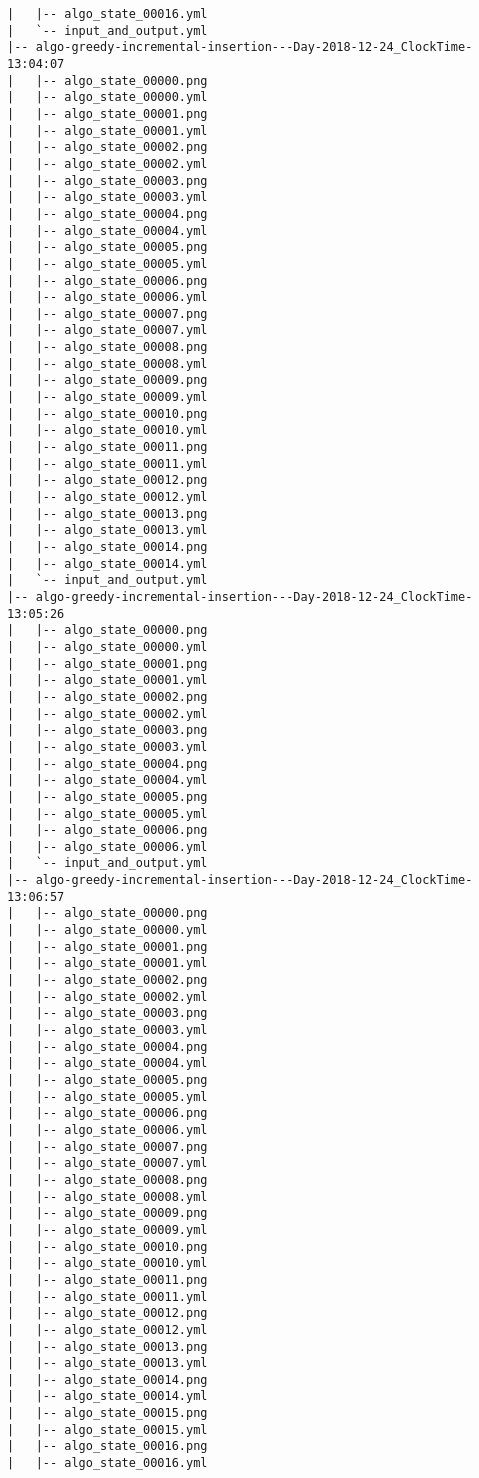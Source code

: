 \begin{verbatim}
|   |-- algo_state_00016.yml
|   `-- input_and_output.yml
|-- algo-greedy-incremental-insertion---Day-2018-12-24_ClockTime-13:04:07
|   |-- algo_state_00000.png
|   |-- algo_state_00000.yml
|   |-- algo_state_00001.png
|   |-- algo_state_00001.yml
|   |-- algo_state_00002.png
|   |-- algo_state_00002.yml
|   |-- algo_state_00003.png
|   |-- algo_state_00003.yml
|   |-- algo_state_00004.png
|   |-- algo_state_00004.yml
|   |-- algo_state_00005.png
|   |-- algo_state_00005.yml
|   |-- algo_state_00006.png
|   |-- algo_state_00006.yml
|   |-- algo_state_00007.png
|   |-- algo_state_00007.yml
|   |-- algo_state_00008.png
|   |-- algo_state_00008.yml
|   |-- algo_state_00009.png
|   |-- algo_state_00009.yml
|   |-- algo_state_00010.png
|   |-- algo_state_00010.yml
|   |-- algo_state_00011.png
|   |-- algo_state_00011.yml
|   |-- algo_state_00012.png
|   |-- algo_state_00012.yml
|   |-- algo_state_00013.png
|   |-- algo_state_00013.yml
|   |-- algo_state_00014.png
|   |-- algo_state_00014.yml
|   `-- input_and_output.yml
|-- algo-greedy-incremental-insertion---Day-2018-12-24_ClockTime-13:05:26
|   |-- algo_state_00000.png
|   |-- algo_state_00000.yml
|   |-- algo_state_00001.png
|   |-- algo_state_00001.yml
|   |-- algo_state_00002.png
|   |-- algo_state_00002.yml
|   |-- algo_state_00003.png
|   |-- algo_state_00003.yml
|   |-- algo_state_00004.png
|   |-- algo_state_00004.yml
|   |-- algo_state_00005.png
|   |-- algo_state_00005.yml
|   |-- algo_state_00006.png
|   |-- algo_state_00006.yml
|   `-- input_and_output.yml
|-- algo-greedy-incremental-insertion---Day-2018-12-24_ClockTime-13:06:57
|   |-- algo_state_00000.png
|   |-- algo_state_00000.yml
|   |-- algo_state_00001.png
|   |-- algo_state_00001.yml
|   |-- algo_state_00002.png
|   |-- algo_state_00002.yml
|   |-- algo_state_00003.png
|   |-- algo_state_00003.yml
|   |-- algo_state_00004.png
|   |-- algo_state_00004.yml
|   |-- algo_state_00005.png
|   |-- algo_state_00005.yml
|   |-- algo_state_00006.png
|   |-- algo_state_00006.yml
|   |-- algo_state_00007.png
|   |-- algo_state_00007.yml
|   |-- algo_state_00008.png
|   |-- algo_state_00008.yml
|   |-- algo_state_00009.png
|   |-- algo_state_00009.yml
|   |-- algo_state_00010.png
|   |-- algo_state_00010.yml
|   |-- algo_state_00011.png
|   |-- algo_state_00011.yml
|   |-- algo_state_00012.png
|   |-- algo_state_00012.yml
|   |-- algo_state_00013.png
|   |-- algo_state_00013.yml
|   |-- algo_state_00014.png
|   |-- algo_state_00014.yml
|   |-- algo_state_00015.png
|   |-- algo_state_00015.yml
|   |-- algo_state_00016.png
|   |-- algo_state_00016.yml

\end{verbatim}
